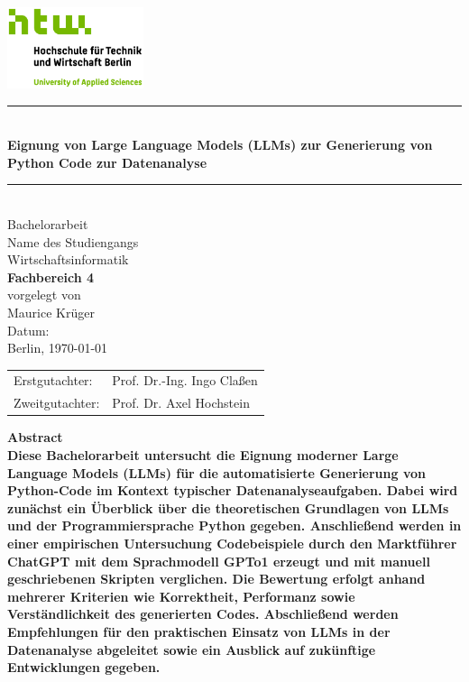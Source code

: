 \documentclass[11pt,a4paper]{article}
\begin{document}
\begin{titlepage}
    \centering
    
    \includegraphics[width=4cm]{./bilder/S04_HTW_Berlin_Logo_pos_FARBIG_RGB.jpg}\\[1.0cm]
    \rule{\linewidth}{0.5pt}\\[0.7cm]
    
    {\color{htwgreen}\bfseries\Large Eignung von Large Language Models (LLMs) zur Generierung von Python Code zur
    Datenanalyse}\\[0.5cm]
    \rule{\linewidth}{0.5pt}\\[2.0cm]
    {\large Bachelorarbeit}\\[1.5cm]
    
    {\large Name des Studiengangs}\\
    {\LARGE Wirtschaftsinformatik}\\[0.3cm]
    {\color{htwgreen}\LARGE \textbf{Fachbereich 4}}\\[1.5cm]
    
    {vorgelegt von}\\
    {\LARGE Maurice Krüger}\\[3cm]
    
    {\Large Datum:}\\
    Berlin, \today\\[2.5cm]

    {\LARGE
    \begin{tabular}{l l}
        Erstgutachter:  & Prof. Dr.-Ing. Ingo Claßen \\
        Zweitgutachter: & Prof. Dr. Axel Hochstein \\
    \end{tabular}
    }

\end{titlepage}

\textbf{
    Abstract\\
    Diese Bachelorarbeit untersucht die Eignung moderner Large Language Models (LLMs) für die automatisierte Generierung von Python-Code im Kontext typischer Datenanalyseaufgaben. Dabei wird zunächst ein Überblick über die theoretischen Grundlagen von LLMs und der Programmiersprache Python gegeben. Anschließend werden in einer empirischen Untersuchung Codebeispiele durch den Marktführer ChatGPT mit dem Sprachmodell GPTo1 erzeugt und mit manuell geschriebenen Skripten verglichen. Die Bewertung erfolgt anhand mehrerer Kriterien wie Korrektheit, Performanz sowie Verständlichkeit des generierten Codes. Abschließend werden Empfehlungen für den praktischen Einsatz von LLMs in der Datenanalyse abgeleitet sowie ein Ausblick auf zukünftige Entwicklungen gegeben.
}
\newpage
\end{document}
